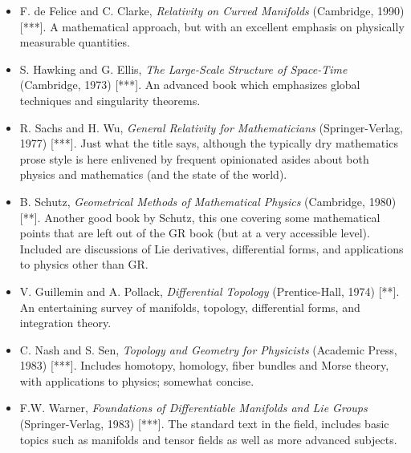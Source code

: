 \begin{itemize}
\item F. de Felice and C. Clarke, {\sl Relativity on Curved Manifolds}
(Cambridge, 1990) [***].  A mathematical approach, but with an excellent
emphasis on physically measurable quantities.

\item S. Hawking and G. Ellis, {\sl The Large-Scale Structure of
Space-Time} (Cambridge, 1973) [***].  An advanced book which emphasizes
global techniques and singularity theorems.

\item R. Sachs and H. Wu, {\sl General Relativity for Mathematicians}
(Springer-Verlag, 1977) [***].  Just what the title says, although the
typically dry mathematics prose style is here enlivened by frequent
opinionated asides about both physics and mathematics (and the state
of the world).

\item B. Schutz, {\sl Geometrical Methods of Mathematical Physics}
(Cambridge, 1980) [**].  Another good book by Schutz, this one covering some
mathematical points that are left out of the GR book (but at a very
accessible level).  Included are
discussions of Lie derivatives, differential forms, and applications to
physics other than GR.

\item V. Guillemin and A. Pollack, {\sl Differential Topology}
(Prentice-Hall, 1974) [**].  An entertaining survey of manifolds, topology,
differential forms, and integration theory.

\item C. Nash and S. Sen, {\sl Topology and Geometry for Physicists}
(Academic Press, 1983) [***].  Includes homotopy, homology, fiber bundles
and Morse theory, with applications to physics; somewhat concise.

\item F.W. Warner, {\sl Foundations of Differentiable Manifolds and
Lie Groups} (Springer-Verlag, 1983) [***].  The standard text in the field,
includes basic topics such as manifolds and tensor fields as well as
more advanced subjects.

\end{itemize}

\eject
\thispagestyle{plain}
\renewcommand{\thepage}{\arabic{page}}
\setcounter{page}{1}
\setcounter{section}{0}
\setcounter{equation}{0}


